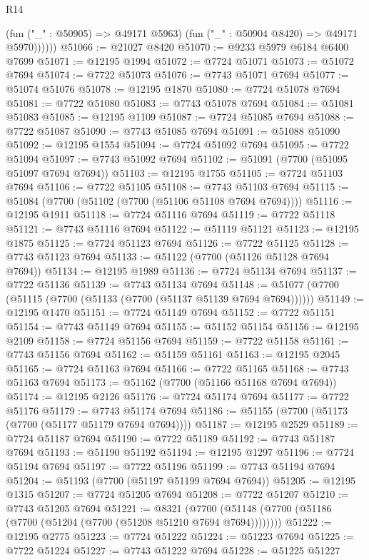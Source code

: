 \begin{lexlean}{R14}
\begin{coremodule}
              (fun ("_" : @50905) => @49171 @5963)
              (fun ("_" : @50904 @8420) => @49171 @5970))))))
@51066 := @21027 @8420
@51070 := @9233 @5979 @6184 @6400 @7699
@51071 := @12195 @1994
@51072 := @7724 @51071
@51073 := @51072 @7694
@51074 := @7722 @51073
@51076 := @7743 @51071 @7694
@51077 := @51074 @51076
@51078 := @12195 @1870
@51080 := @7724 @51078 @7694
@51081 := @7722 @51080
@51083 := @7743 @51078 @7694
@51084 := @51081 @51083
@51085 := @12195 @1109
@51087 := @7724 @51085 @7694
@51088 := @7722 @51087
@51090 := @7743 @51085 @7694
@51091 := @51088 @51090
@51092 := @12195 @1554
@51094 := @7724 @51092 @7694
@51095 := @7722 @51094
@51097 := @7743 @51092 @7694
@51102 := @51091 (@7700 (@51095 @51097 @7694 @7694))
@51103 := @12195 @1755
@51105 := @7724 @51103 @7694
@51106 := @7722 @51105
@51108 := @7743 @51103 @7694
@51115 := @51084 (@7700 (@51102 (@7700 (@51106 @51108 @7694 @7694))))
@51116 := @12195 @1911
@51118 := @7724 @51116 @7694
@51119 := @7722 @51118
@51121 := @7743 @51116 @7694
@51122 := @51119 @51121
@51123 := @12195 @1875
@51125 := @7724 @51123 @7694
@51126 := @7722 @51125
@51128 := @7743 @51123 @7694
@51133 := @51122 (@7700 (@51126 @51128 @7694 @7694))
@51134 := @12195 @1989
@51136 := @7724 @51134 @7694
@51137 := @7722 @51136
@51139 := @7743 @51134 @7694
@51148 := @51077 (@7700 (@51115 (@7700 (@51133 (@7700 (@51137 @51139 @7694 @7694))))))
@51149 := @12195 @1470
@51151 := @7724 @51149 @7694
@51152 := @7722 @51151
@51154 := @7743 @51149 @7694
@51155 := @51152 @51154
@51156 := @12195 @2109
@51158 := @7724 @51156 @7694
@51159 := @7722 @51158
@51161 := @7743 @51156 @7694
@51162 := @51159 @51161
@51163 := @12195 @2045
@51165 := @7724 @51163 @7694
@51166 := @7722 @51165
@51168 := @7743 @51163 @7694
@51173 := @51162 (@7700 (@51166 @51168 @7694 @7694))
@51174 := @12195 @2126
@51176 := @7724 @51174 @7694
@51177 := @7722 @51176
@51179 := @7743 @51174 @7694
@51186 := @51155 (@7700 (@51173 (@7700 (@51177 @51179 @7694 @7694))))
@51187 := @12195 @2529
@51189 := @7724 @51187 @7694
@51190 := @7722 @51189
@51192 := @7743 @51187 @7694
@51193 := @51190 @51192
@51194 := @12195 @1297
@51196 := @7724 @51194 @7694
@51197 := @7722 @51196
@51199 := @7743 @51194 @7694
@51204 := @51193 (@7700 (@51197 @51199 @7694 @7694))
@51205 := @12195 @1315
@51207 := @7724 @51205 @7694
@51208 := @7722 @51207
@51210 := @7743 @51205 @7694
@51221 := @8321
    (@7700 (@51148 (@7700 (@51186 (@7700 (@51204 (@7700 (@51208 @51210 @7694 @7694))))))))
@51222 := @12195 @2775
@51223 := @7724 @51222
@51224 := @51223 @7694
@51225 := @7722 @51224
@51227 := @7743 @51222 @7694
@51228 := @51225 @51227

\end{coremodule}
\end{lexlean}
